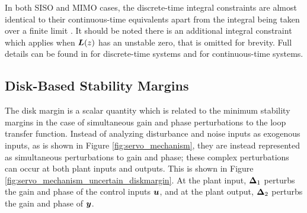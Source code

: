 In both SISO and MIMO cases, the discrete-time integral constraints are almost identical to their continuous-time equivalents apart from the integral being taken over a finite limit \cite{emami2019bode}.  It should be noted there is an additional integral constraint which applies when $\vb*{L}(z)$ has an unstable zero, that is omitted for brevity.  Full details can be found in \cite{chen2000logarithmic,emami2019bode} for discrete-time systems and \cite{freudenberg1985right, freudenberg1988frequency, boyd1991linear, chen1997logarithmic, chen1998logarithmic, stein2003respect, skogestad2005multivariable} for continuous-time systems.

\subsection{Disk-Based Stability Margins}
The disk margin \cite{seiler2020introduction} is a scalar quantity which is related to the minimum stability margins in the case of simultaneous gain and phase perturbations to the loop transfer function.  Instead of analyzing disturbance and noise inputs as exogenous inputs, as is shown in Figure \ref{fig:servo_mechanism}, they are instead represented as simultaneous perturbations to gain and phase; these complex perturbations can occur at both plant inputs and outputs.  This is shown in Figure \ref{fig:servo_mechanism_uncertain_diskmargin}.  At the plant input, $\vb*{\Delta}_{1}$ perturbs the gain and phase of the control inputs $\vb*{u}$, and at the plant output, $\vb*{\Delta}_{2}$ perturbs the gain and phase of $\vb*{y}$.

